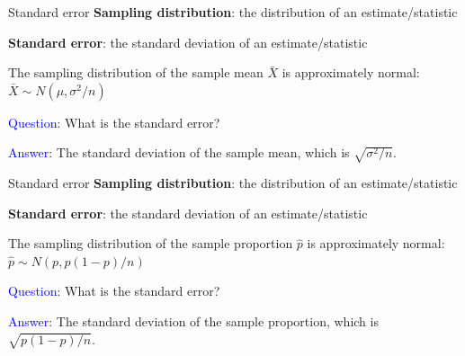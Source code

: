 \documentclass[10pt,t]{beamer}
\begin{document}
\begin{frame}{Standard error}
\textbf{Sampling distribution}: the distribution of an estimate/statistic
\medskip

\textbf{Standard error}: the standard deviation of an estimate/statistic

\vspace{0.3cm} 

The sampling distribution of the sample mean $\bar{X}$ is approximately normal: $\bar{X} \sim N(\mu, \sigma^2/n)$

\vspace{0.3cm}

\textcolor{blue}{Question}: What is the standard error? \pause

\vspace{0.3cm}

\textcolor{blue}{Answer}: The standard deviation of the sample mean, which is $\sqrt{\sigma^2/n}$.
\end{frame}

\begin{frame}{Standard error}
\textbf{Sampling distribution}: the distribution of an estimate/statistic
\medskip

\textbf{Standard error}: the standard deviation of an estimate/statistic

\vspace{0.3cm} 

The sampling distribution of the sample proportion $\hat{p}$ is approximately normal: $\hat{p} \sim N(p, p(1-p)/n)$

\vspace{0.3cm}

\textcolor{blue}{Question}: What is the standard error? \pause

\vspace{0.3cm}

\textcolor{blue}{Answer}: The standard deviation of the sample proportion, which is $\sqrt{p(1-p)/n}$.
\end{frame}
\end{document}
